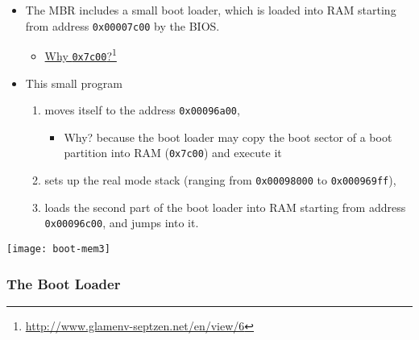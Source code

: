\begin{varwidth}{.65\textwidth}
  \begin{itemize}
  \item The MBR includes a small boot loader, which is loaded into RAM starting from
    address \texttt{0x00007c00} by the BIOS.

    \begin{itemize}
    \item \href{http://www.glamenv-septzen.net/en/view/6}{Why \texttt{0x7c00}?}\footnote{\url{http://www.glamenv-septzen.net/en/view/6}}
    \end{itemize}

  \item This small program
    \begin{enumerate}
    \item moves itself to the address \texttt{0x00096a00},
      \begin{itemize}
      \item Why? because the boot loader may copy the boot sector of a boot
        partition into RAM (\texttt{0x7c00}) and execute it
      \end{itemize}
    \item sets up the real mode stack (ranging from \texttt{0x00098000} to
      \texttt{0x000969ff}),
    \item loads the second part of the boot loader into RAM starting from address
      \texttt{0x00096c00}, and jumps into it.
    \end{enumerate}
  \end{itemize}
\end{varwidth}\hfill
\begin{varwidth}{.3\textwidth}
  \texttt{[image: boot-mem3]}
\end{varwidth}

\subsubsection{The Boot Loader}

